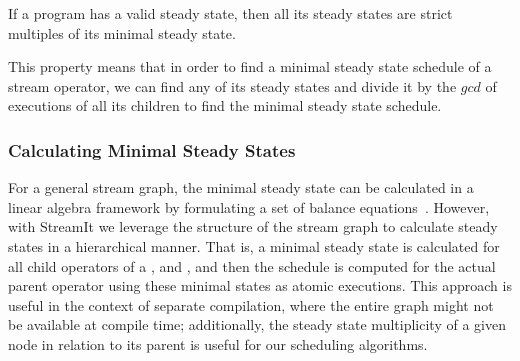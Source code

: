 \begin{theorem} If a
{\StreamIt} program has a valid steady state, then all its steady
states are strict multiples of its minimal steady state.
\label{thm:multiplicity}
\end{theorem}

\begin{comment}
\begin{proof}[Multiplicity of Minimal Steady State]
Assume that there exists a steady state that is not a multiple of
the minimal steady state.  Let $m$ denote the minimal steady
state. Let $q$ denote the other steady state.  Note that $w = q -
m$ is still a steady state, as long as all elements of $w$ remain
non-negative (by Corollary \ref{corollary:composition}).  Repeat
subtracting $m$ from $q$ until no more subtractions can be
performed without generating at least one negative element in
vector $w$.  Since $q$ is not a multiple of $m$, $w \ne 0$. But
since we cannot subtract $m$ from $w$ any further, $\exists i, m_i
> w_i$.  Since $m$ is a minimal steady state and $w$ is a steady
state, this is impossible due to Corollary
\ref{corollary:minimal-state}. Thus there are no steady states
that are not multiples of the minimal steady schedule.
\end{proof}
\end{comment}

This property means that in order to find a minimal steady state
schedule of a stream operator, we can find any of its steady states
and divide it by the $gcd$ of executions of all its children to find
the minimal steady state schedule.

\subsubsection{Calculating Minimal Steady States}
\label{sec:calc-min-steady}

For a general stream graph, the minimal steady state can be calculated
in a linear algebra framework by formulating a set of balance
equations~\cite{lee87static}.  However, with StreamIt we leverage the
structure of the stream graph to calculate steady states in a
hierarchical manner.  That is, a minimal steady state is calculated
for all child operators of a {\pipeline}, {\splitjoin} and
{\feedbackloop}, and then the schedule is computed for the actual
parent operator using these minimal states as atomic executions.  This
approach is useful in the context of separate compilation, where the
entire graph might not be available at compile time; additionally, the
steady state multiplicity of a given node in relation to its parent is
useful for our scheduling algorithms.

